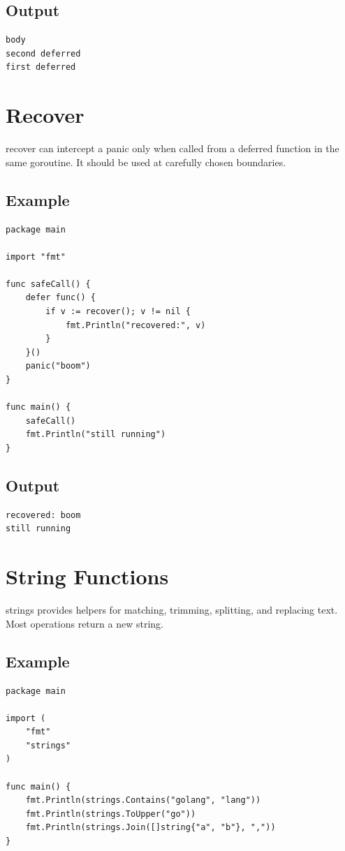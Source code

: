\documentclass[10pt,oneside]{article}
\newcommand{\sectionline}{\par\vspace{4pt}{\color{rule}\hrule height .5pt}\vspace{7pt}\color{ink}\noindent}
\begin{document}
\subsection*{Output}
\begin{lstlisting}[style=terminal]
body
second deferred
first deferred
\end{lstlisting}
\clearpage
\section{Recover}
\sectionline
recover can intercept a panic only when called from a deferred function in the same goroutine. It should be used at carefully chosen boundaries.\par
\subsection*{Example}
\begin{lstlisting}[style=gocode]
package main

import "fmt"

func safeCall() {
	defer func() {
		if v := recover(); v != nil {
			fmt.Println("recovered:", v)
		}
	}()
	panic("boom")
}

func main() {
	safeCall()
	fmt.Println("still running")
}
\end{lstlisting}
\subsection*{Output}
\begin{lstlisting}[style=terminal]
recovered: boom
still running
\end{lstlisting}
\clearpage
\section{String Functions}
\sectionline
strings provides helpers for matching, trimming, splitting, and replacing text. Most operations return a new string.\par
\subsection*{Example}
\begin{lstlisting}[style=gocode]
package main

import (
	"fmt"
	"strings"
)

func main() {
	fmt.Println(strings.Contains("golang", "lang"))
	fmt.Println(strings.ToUpper("go"))
	fmt.Println(strings.Join([]string{"a", "b"}, ","))
}
\end{lstlisting}
\end{document}
